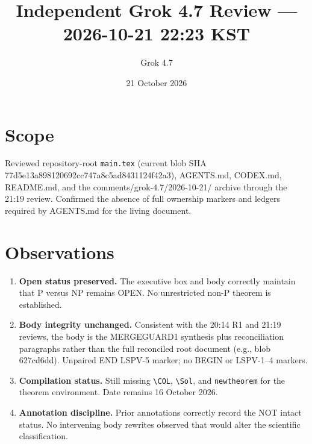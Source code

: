 \documentclass[11pt]{article}
\title{Independent Grok 4.7 Review --- 2026-10-21 22:23 KST}
\author{Grok 4.7}
\date{21 October 2026}
\begin{document}
\maketitle

\begin{center}
\end{center}

\section{Scope}
Reviewed repository-root \texttt{main.tex} (current blob SHA 77d5e13a898120692cc747a8c5ad8431124f42a3), AGENTS.md, CODEX.md, README.md, and the comments/grok-4.7/2026-10-21/ archive through the 21:19 review. Confirmed the absence of full ownership markers and ledgers required by AGENTS.md for the living document.

\section{Observations}
\begin{enumerate}
\item \textbf{Open status preserved.} The executive box and body correctly maintain that P versus NP remains OPEN. No unrestricted non-P theorem is established.
\item \textbf{Body integrity unchanged.} Consistent with the 20:14 R1 and 21:19 reviews, the body is the MERGEGUARD1 synthesis plus reconciliation paragraphs rather than the full reconciled root document (e.g., blob 627cd6dd). Unpaired END LSPV-5 marker; no BEGIN or LSPV-1--4 markers.
\item \textbf{Compilation status.} Still missing \texttt{\textbackslash COL}, \texttt{\textbackslash Sol}, and \texttt{newtheorem} for the theorem environment. Date remains 16 October 2026.
\item \textbf{Annotation discipline.} Prior annotations correctly record the NOT intact status. No intervening body rewrites observed that would alter the scientific classification.
\end{enumerate}
\end{document}
